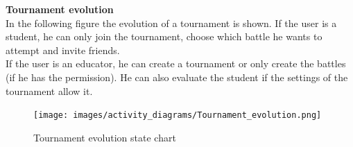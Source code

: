 \clearpage
\textbf{Tournament evolution}\\
In the following figure the evolution of a tournament is shown. If the user is a student, he can only join
the tournament, choose which battle he wants to attempt and invite friends.\\ If the user is an educator, he
can create a tournament or only create the battles (if he has the permission). He can also evaluate 
the student if the settings of the tournament allow it.
\begin{figure} [H]
  \centering
  \texttt{[image: images/activity\_diagrams/Tournament\_evolution.png]}
  \caption{Tournament evolution state chart}
\end{figure} \vspace{1cm}

\clearpage

